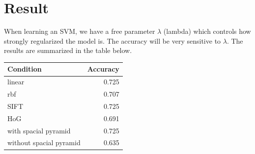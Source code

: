 \section*{Result}
 When learning an SVM, we have a free parameter $\lambda$ (lambda) which controls how strongly regularized the model is. The accuracy will be very sensitive to $\lambda$.
The results are summarized in the table below.

\begin{table}[h]
    \centering
    \begin{tabular}{lr}
        \toprule
        Condition & Accuracy \\
        \midrule
        linear & 0.725 \\
        rbf & 0.707 \\
        SIFT & 0.725\\
        HoG & 0.691\\
        with spacial pyramid & 0.725\\
        without spacial pyramid & 0.635\\
        
        \bottomrule
    \end{tabular}

\end{table}



